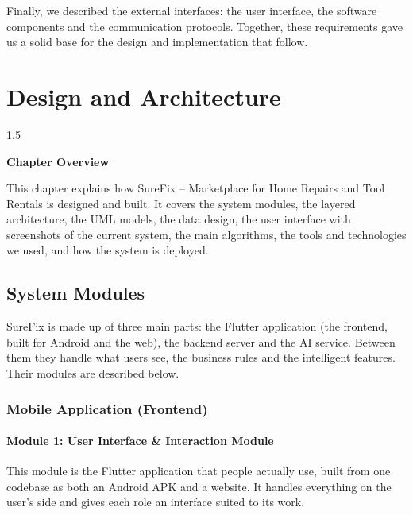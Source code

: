\documentclass[A4paper,12pt]{report}
\theoremstyle{plain}
\theoremstyle{definition}
\theoremstyle{remark}
\numberwithin{equation}{section}
\begin{document}
Finally, we described the external interfaces: the user interface, the software components and the communication protocols. Together, these requirements gave us a solid base for the design and implementation that follow.


\chapter{Design and Architecture
}
\thispagestyle{empty}
\newpage
\begin{spacing}{1.5}

\thispagestyle{empty}

{\centering \Large \bfseries Chapter Overview \par}
\vspace{1cm} %

This chapter explains how SureFix – Marketplace for Home Repairs and Tool Rentals is designed and built. It covers the system modules, the layered architecture, the UML models, the data design, the user interface with screenshots of the current system, the main algorithms, the tools and technologies we used, and how the system is deployed.

\end{spacing}

\section{System Modules}

SureFix is made up of three main parts: the Flutter application (the frontend, built for Android and the web), the backend server and the AI service. Between them they handle what users see, the business rules and the intelligent features. Their modules are described below.

\subsection{Mobile Application (Frontend)}

\subsubsection{Module 1: User Interface \& Interaction Module}

This module is the Flutter application that people actually use, built from one codebase as both an Android APK and a website. It handles everything on the user's side and gives each role an interface suited to its work.
\end{document}
